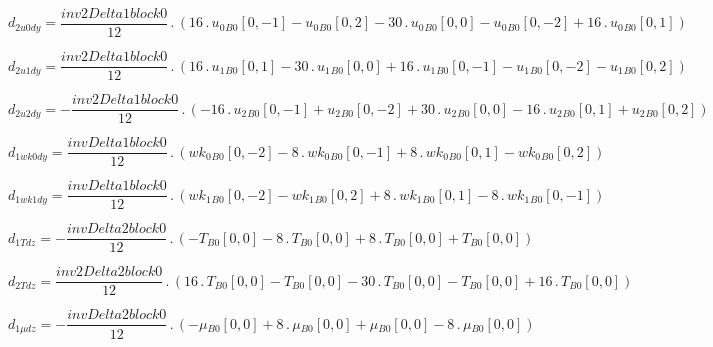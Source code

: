 \documentclass{article}
\begin{document}
\begin{dmath}d_{2 u0 dy} = \frac{inv2Delta1block0}{12} \,.\, \left(16 \,.\, {u_{0}{_{B0}}}[{0,-1}] - {u_{0}{_{B0}}}[{0,2}] - 30 \,.\, {u_{0}{_{B0}}}[{0,0}] - {u_{0}{_{B0}}}[{0,-2}] + 16 \,.\, {u_{0}{_{B0}}}[{0,1}]\right)\end{dmath}

\begin{dmath}d_{2 u1 dy} = \frac{inv2Delta1block0}{12} \,.\, \left(16 \,.\, {u_{1}{_{B0}}}[{0,1}] - 30 \,.\, {u_{1}{_{B0}}}[{0,0}] + 16 \,.\, {u_{1}{_{B0}}}[{0,-1}] - {u_{1}{_{B0}}}[{0,-2}] - {u_{1}{_{B0}}}[{0,2}]\right)\end{dmath}

\begin{dmath}d_{2 u2 dy} = - \frac{inv2Delta1block0}{12} \,.\, \left(- 16 \,.\, {u_{2}{_{B0}}}[{0,-1}] + {u_{2}{_{B0}}}[{0,-2}] + 30 \,.\, {u_{2}{_{B0}}}[{0,0}] - 16 \,.\, {u_{2}{_{B0}}}[{0,1}] + {u_{2}{_{B0}}}[{0,2}]\right)\end{dmath}

\begin{dmath}d_{1 wk0 dy} = \frac{invDelta1block0}{12} \,.\, \left({wk_{0}{_{B0}}}[{0,-2}] - 8 \,.\, {wk_{0}{_{B0}}}[{0,-1}] + 8 \,.\, {wk_{0}{_{B0}}}[{0,1}] - {wk_{0}{_{B0}}}[{0,2}]\right)\end{dmath}

\begin{dmath}d_{1 wk1 dy} = \frac{invDelta1block0}{12} \,.\, \left({wk_{1}{_{B0}}}[{0,-2}] - {wk_{1}{_{B0}}}[{0,2}] + 8 \,.\, {wk_{1}{_{B0}}}[{0,1}] - 8 \,.\, {wk_{1}{_{B0}}}[{0,-1}]\right)\end{dmath}

\begin{dmath}d_{1 T dz} = - \frac{invDelta2block0}{12} \,.\, \left(- {T{_{B0}}}[{0,0}] - 8 \,.\, {T{_{B0}}}[{0,0}] + 8 \,.\, {T{_{B0}}}[{0,0}] + {T{_{B0}}}[{0,0}]\right)\end{dmath}

\begin{dmath}d_{2 T dz} = \frac{inv2Delta2block0}{12} \,.\, \left(16 \,.\, {T{_{B0}}}[{0,0}] - {T{_{B0}}}[{0,0}] - 30 \,.\, {T{_{B0}}}[{0,0}] - {T{_{B0}}}[{0,0}] + 16 \,.\, {T{_{B0}}}[{0,0}]\right)\end{dmath}

\begin{dmath}d_{1 \mu dz} = - \frac{invDelta2block0}{12} \,.\, \left(- {\mu{_{B0}}}[{0,0}] + 8 \,.\, {\mu{_{B0}}}[{0,0}] + {\mu{_{B0}}}[{0,0}] - 8 \,.\, {\mu{_{B0}}}[{0,0}]\right)\end{dmath}
\end{document}
